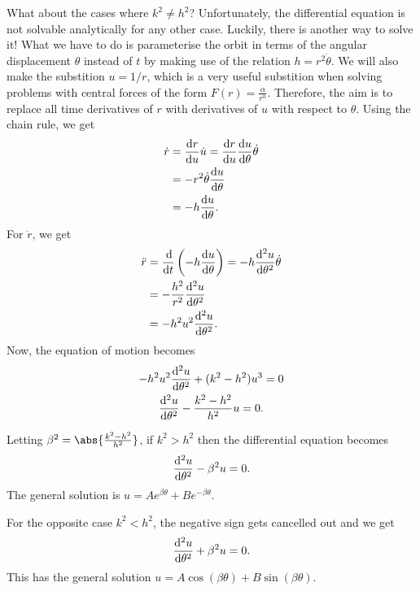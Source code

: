 \documentclass[../classical_mechanics.tex]{subfiles}
\begin{document}
\begin{example}
                What about the cases where $k^2\neq h^2$?
                Unfortunately, the differential equation is not solvable analytically for any other case.
                Luckily, there is another way to solve it!
                What we have to do is parameterise the orbit in terms of the angular displacement $\theta$ instead of $t$ by making use of the relation $h=r^2\dot{\theta}$.
                We will also make the substition $u=1/r$, which is a very useful substition when solving problems with central forces of the form $F(r)=\frac{\alpha}{r^n}$.
                Therefore, the aim is to replace all time derivatives of $r$ with derivatives of $u$ with respect to $\theta$.
                Using the chain rule, we get
                \begin{align}
                    \dot{r}&=\dv{r}{u}\dot{u}=\dv{r}{u}\dv{u}{\theta}\dot{\theta}\\
                    &=-r^2\dot{\theta}\dv{u}{\theta}\\
                    &=-h\dv{u}{\theta}.
                \end{align}
                For $\ddot{r}$, we get
                \begin{align}
                    \ddot{r}&=\dv{}{t}\left(-h\dv{u}{\theta}\right)=-h\dv[2]{u}{\theta}\dot{\theta}\\
                    &=-\frac{h^2}{r^2}\dv[2]{u}{\theta}\\
                    &=-h^2u^2\dv[2]{u}{\theta}.
                \end{align}
                Now, the equation of motion becomes
                \begin{gather}
                    -h^2u^2\dv[2]{u}{\theta}+(k^2-h^2)u^3=0\\
                    \dv[2]{u}{\theta}-\frac{k^2-h^2}{h^2}u=0.
                \end{gather}

                Letting $\beta^2=\abs{\frac{k^2-h^2}{h^2}}$, if $k^2>h^2$ then the differential equation becomes
                \begin{equation}
                    \dv[2]{u}{\theta}-\beta^2 u=0.
                \end{equation}
                The general solution is $u=Ae^{\beta\theta}+Be^{-\beta\theta}$.

                For the opposite case $k^2<h^2$, the negative sign gets cancelled out and we get
                \begin{equation}
                    \dv[2]{u}{\theta}+\beta^2 u=0.
                \end{equation}
                This has the general solution $u=A\cos(\beta\theta)+B\sin(\beta\theta)$.

            \end{example}
\end{document}
